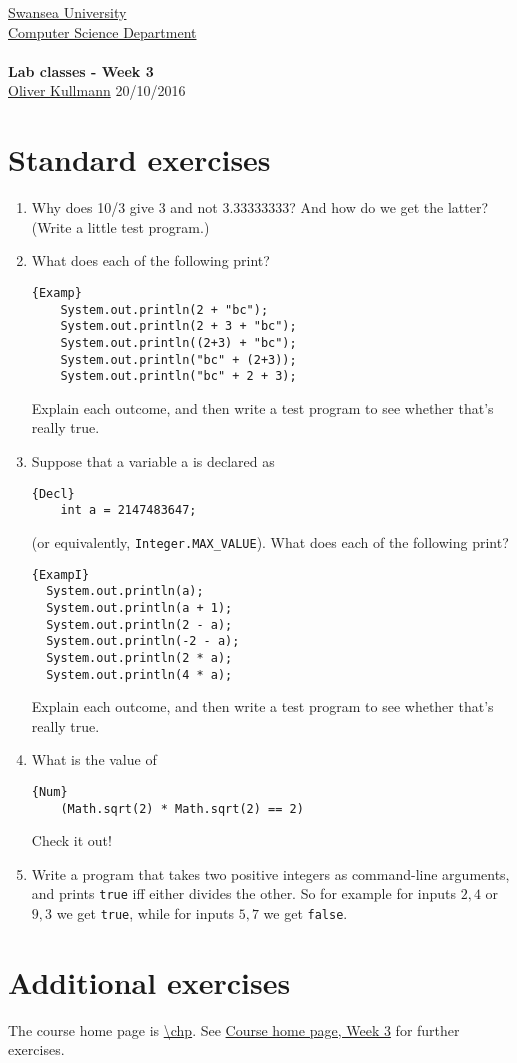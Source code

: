\documentclass[11pt]{article}
\newcommand{\Java}{\lstset{language=Java,keywordstyle=\bfseries,breaklines,breakindent=30pt}}
\begin{document}
\begin{center}
  \href{http://www.swan.ac.uk/}{Swansea University}\\
  \href{http://www.swan.ac.uk/compsci/}{Computer Science Department}\\[1ex]
  \href{\chp}{\module}\\[1ex]
  \textbf{Lab classes - Week 3}\\
  \href{http://cs.swan.ac.uk/~csoliver}{Oliver Kullmann} 20/10/2016
\end{center}


\section{Standard exercises}
\label{sec:stdex}

\Java

\begin{enumerate}
\item Why does 10/3 give 3 and not 3.33333333? And how do we get the latter? (Write a little test program.)
\item What does each of the following print?
  \begin{lstlisting}{Examp}
    System.out.println(2 + "bc");
    System.out.println(2 + 3 + "bc");
    System.out.println((2+3) + "bc");
    System.out.println("bc" + (2+3));
    System.out.println("bc" + 2 + 3);
  \end{lstlisting}
  Explain each outcome, and then write a test program to see whether that's really true.
\item Suppose that a variable a is declared as
  \begin{lstlisting}{Decl}
    int a = 2147483647;
  \end{lstlisting}
  (or equivalently, \texttt{Integer.MAX\_VALUE}). What does each of the following print?
\begin{lstlisting}{ExampI}
  System.out.println(a);
  System.out.println(a + 1);
  System.out.println(2 - a);
  System.out.println(-2 - a);
  System.out.println(2 * a);
  System.out.println(4 * a);
  \end{lstlisting}
Explain each outcome, and then write a test program to see whether that's really true.
\item What is the value of
  \begin{lstlisting}{Num}
    (Math.sqrt(2) * Math.sqrt(2) == 2)
  \end{lstlisting}
  Check it out!
\item Write a program that takes two positive integers as command-line arguments, and prints \texttt{true} iff either divides the other. So for example for inputs $2,4$ or $9,3$ we get \texttt{true}, while for inputs $5,7$ we get \texttt{false}.
\end{enumerate}


\section{Additional exercises}
\label{sec:addex}

The course home page is \url{\chp}. See \href{\chp#ExercisesWeek03}{Course home page, Week 3} for further exercises.
\end{document}
